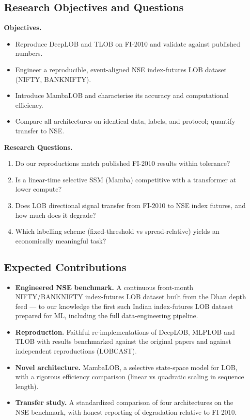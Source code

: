 \documentclass[11pt]{article}
\begin{document}
\subsection{Research Objectives and Questions}
\textbf{Objectives.}
\begin{itemize}[nosep]
  \item Reproduce DeepLOB and TLOB on FI-2010 and validate against published numbers.
  \item Engineer a reproducible, event-aligned NSE index-futures LOB dataset (NIFTY, BANKNIFTY).
  \item Introduce MambaLOB and characterise its accuracy and computational efficiency.
  \item Compare all architectures on identical data, labels, and protocol; quantify transfer to NSE.
\end{itemize}
\textbf{Research Questions.}
\begin{enumerate}[nosep]
  \item Do our reproductions match published FI-2010 results within tolerance?
  \item Is a linear-time selective SSM (Mamba) competitive with a transformer at lower compute?
  \item Does LOB directional signal transfer from FI-2010 to NSE index futures, and how much does it degrade?
  \item Which labelling scheme (fixed-threshold vs spread-relative) yields an economically meaningful task?
\end{enumerate}

\subsection{Expected Contributions}
\begin{itemize}[nosep]
  \item \textbf{Engineered NSE benchmark.} A continuous front-month NIFTY/BANKNIFTY index-futures LOB
        dataset built from the Dhan depth feed --- to our knowledge the first such Indian index-futures LOB
        dataset prepared for ML, including the full data-engineering pipeline.
  \item \textbf{Reproduction.} Faithful re-implementations of DeepLOB, MLPLOB and TLOB with results
        benchmarked against the original papers and against independent reproductions (LOBCAST).
  \item \textbf{Novel architecture.} MambaLOB, a selective state-space model for LOB, with a rigorous
        efficiency comparison (linear vs quadratic scaling in sequence length).
  \item \textbf{Transfer study.} A standardized comparison of four architectures on the NSE benchmark, with
        honest reporting of degradation relative to FI-2010.
\end{itemize}
\end{document}
